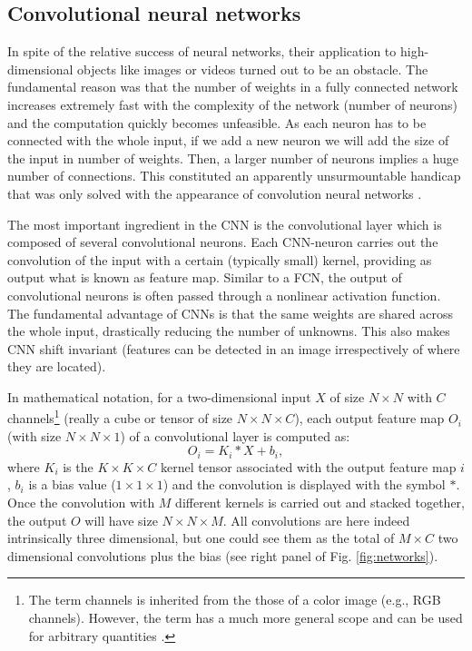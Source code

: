 \subsection{Convolutional neural networks}
In spite of the relative success of neural networks, their application to 
high-dimensional objects like images or videos turned out to be
an obstacle. The fundamental reason was that the number of
weights in a fully connected network increases extremely fast with the complexity of the network (number of neurons) and the computation quickly becomes unfeasible.
As each neuron has to be connected with the whole input, if we add a new neuron we will add the size of the input in number of weights. Then, a larger number of neurons implies a huge number of connections.
This constituted an
apparently unsurmountable handicap that was only solved with the
appearance of convolution neural networks \cite[CNN or ConvNets;][]{LeCun1998}.

The most important ingredient in the CNN is the convolutional layer which is composed of
several convolutional neurons. Each CNN-neuron carries out the convolution of the input with a certain
(typically small) kernel, providing as output what is known as feature map. Similar to a FCN, the output of
convolutional neurons is often passed through a nonlinear activation function.
The fundamental advantage of CNNs is that the same weights are shared across the whole input, 
drastically reducing the number of unknowns. This also makes
CNN shift invariant (features can be detected in an image irrespectively of
where they are located). 


In mathematical notation, for a two-dimensional input $X$
of size $N \times N$ with $C$ channels\footnote{The term channels is inherited from
the those of a color image (e.g., RGB channels). However, the term has a much more general
scope and can be used for arbitrary quantities \cite[see][for an application]{Asensio2017}.} 
(really a cube or tensor of size $N \times N \times C$), each output feature map $O_i$ (with size $N \times N \times 1$) of a convolutional layer is computed as:
\begin{equation}
O_i=K_i * X + b_i,
\end{equation}
where $K_i$ is the $K \times K \times C$ kernel tensor associated with the output feature map $i$, 
$b_i$ is a bias value ($1 \times 1 \times 1$) and the convolution is displayed with the symbol $*$. 
Once the convolution with $M$ different kernels is carried out and stacked together, the output 
$O$ will have size $N \times N \times M$. All convolutions are here indeed intrinsically three dimensional, 
but one could see them as the total of $M \times C$ two dimensional convolutions plus the 
bias (see right panel of Fig. \ref{fig:networks}).

